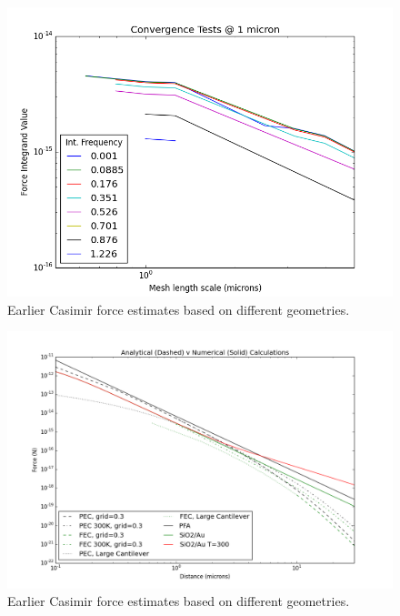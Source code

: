 \documentclass[11pt,traditabstract]{article}
\begin{document}
\begin{figure}[h]
\centering
\includegraphics[width=5.5in]{convergence}
\caption{Earlier Casimir force estimates based on different geometries.}\label{fig:conv1}
\end{figure}

\begin{figure}[h]
\centering
\includegraphics[width=7in]{analytic_v_numerical}
\caption{Earlier Casimir force estimates based on different geometries.}\label{fig:earlyEstimate}
\end{figure}
\end{document}
